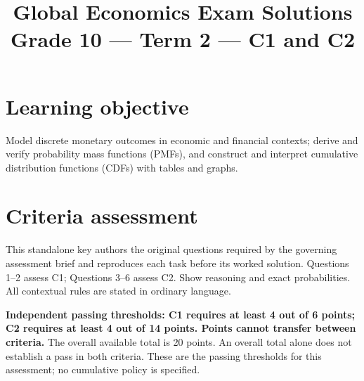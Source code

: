 \makeatletter
{}
\makeatother

\linespread{0.98}
\setlength{\parskip}{2pt}
\renewcommand{\arraystretch}{1.0}
\setlength{\emergencystretch}{2em}
\title{Global Economics Exam Solutions\\Grade 10 --- Term 2 --- C1 and C2}
\author{}
\date{}
\makeatletter
\renewcommand{\@maketitle}{\begin{center}{\Large\bfseries\@title\par}\end{center}}
\renewcommand\subsection{\@startsection{subsection}{2}{\z@}{-1.4ex plus -.3ex}{.7ex}{\normalfont\large\bfseries}}
\makeatother
{}

\maketitle
\small
\setlength{\topsep}{3pt}
\setcounter{tocdepth}{1}
\label{toc}
\tableofcontents
\section*{Learning objective}
Model discrete monetary outcomes in economic and financial contexts; derive and verify probability mass functions (PMFs), and construct and interpret cumulative distribution functions (CDFs) with tables and graphs.
\section*{Criteria assessment}
This standalone key authors the original questions required by the governing assessment brief and reproduces each task before its worked solution. Questions 1--2 assess C1; Questions 3--6 assess C2. Show reasoning and exact probabilities. All contextual rules are stated in ordinary language.

\textbf{Independent passing thresholds: C1 requires at least 4 out of 6 points; C2 requires at least 4 out of 14 points. Points cannot transfer between criteria.} The overall available total is 20 points. An overall total alone does not establish a pass in both criteria. These are the passing thresholds for this assessment; no cumulative policy is specified.
